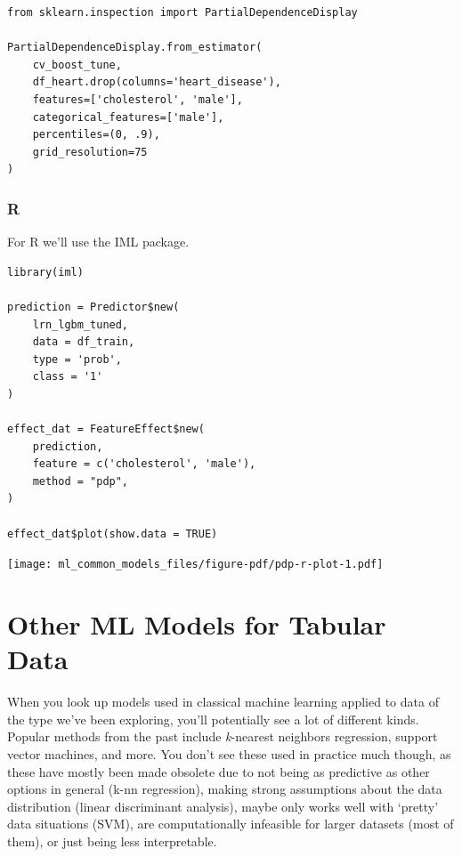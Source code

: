 \documentclass[
  letterpaper,
]{krantz}
\begin{document}
\begin{verbatim}
from sklearn.inspection import PartialDependenceDisplay

PartialDependenceDisplay.from_estimator(
    cv_boost_tune, 
    df_heart.drop(columns='heart_disease'), 
    features=['cholesterol', 'male'], 
    categorical_features=['male'], 
    percentiles=(0, .9),
    grid_resolution=75
)
\end{verbatim}

\subsubsection{R}

For R we'll use the IML package.

\begin{verbatim}
library(iml)

prediction = Predictor$new(
    lrn_lgbm_tuned, 
    data = df_train, 
    type = 'prob', 
    class = '1'
)

effect_dat = FeatureEffect$new(
    prediction, 
    feature = c('cholesterol', 'male'), 
    method = "pdp", 
)

effect_dat$plot(show.data = TRUE)
\end{verbatim}

\texttt{[image: ml\_common\_models\_files/figure-pdf/pdp-r-plot-1.pdf]}

\section{Other ML Models for Tabular Data}\label{sec-ml-other-models}

When you look up models used in classical machine learning applied to
data of the type we've been exploring, you'll potentially see a lot of
different kinds. Popular methods from the past include \emph{k}-nearest
neighbors regression, support vector machines, and more. You don't see
these used in practice much though, as these have mostly been made
obsolete due to not being as predictive as other options in general
(k-nn regression), making strong assumptions about the data distribution
(linear discriminant analysis), maybe only works well with `pretty' data
situations (SVM), are computationally infeasible for larger datasets
(most of them), or just being less interpretable.
\end{document}
